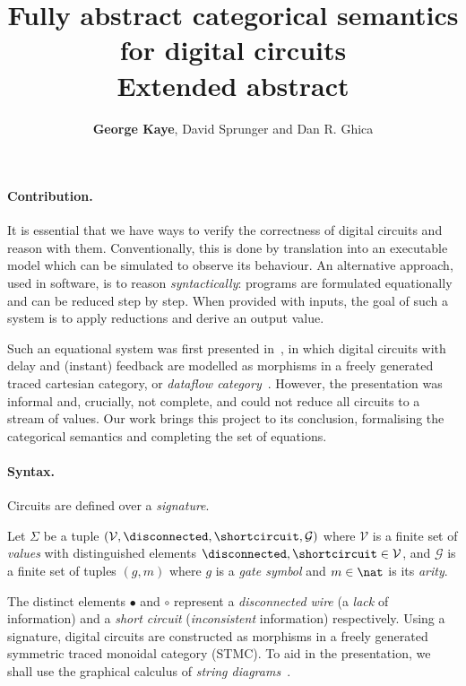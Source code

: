 \documentclass[10pt]{article}
\title{\vspace{-3em}Fully abstract categorical semantics for digital circuits\\\textbf{Extended abstract}}
\author{\textbf{George Kaye}, David Sprunger and Dan R. Ghica}
\begin{document}
    \maketitle

    \paragraph*{Contribution.}
    It is essential that we have ways to verify the correctness of digital circuits and reason with them.
    Conventionally, this is done by translation into an executable model which can be simulated to observe its behaviour.
    An alternative approach, used in software, is to reason \emph{syntactically}: programs are formulated equationally and can be reduced step by step.
    When provided with inputs, the goal of such a system is to apply reductions and derive an output value.

    Such an equational system was first presented in~\cite{ghica2016categorical,ghica2017diagrammatic}, in which digital circuits with delay and (instant) feedback are modelled as morphisms in a freely generated traced cartesian category, or \emph{dataflow category}~\cite{cazanescu1994feedback,hasegawa1997recursion}.
    However, the presentation was informal and, crucially, not complete, and could not reduce all circuits to a stream of values.
    Our work brings this project to its conclusion, formalising the categorical semantics and completing the set of equations.

    \paragraph*{Syntax.}
    Circuits are defined over a \emph{signature}.

    \begin{definition}
        Let \(\Sigma\) be a tuple \((\mathcal{V},\disconnected,\shortcircuit,\mathcal{G})\) where \(\mathcal{V}\) is a finite set of \emph{values} with distinguished elements \(\disconnected,\shortcircuit \in \mathcal{V}\), and \(\mathcal{G}\) is a finite set of tuples \((g,m)\) where \(g\) is a \emph{gate symbol} and \(m \in \nat\) is its \emph{arity}.
    \end{definition}

    \noindent
    The distinct elements \(\bullet\) and \(\circ\) represent a \emph{disconnected wire} (a \emph{lack} of information) and a \emph{short circuit} (\emph{inconsistent} information) respectively.
    Using a signature, digital circuits are constructed as morphisms in a freely generated symmetric traced monoidal category (STMC).
    To aid in the presentation, we shall use the graphical calculus of \emph{string diagrams}~\cite{joyal1991geometry,joyal1996traced,selinger2011survey}.
\end{document}

